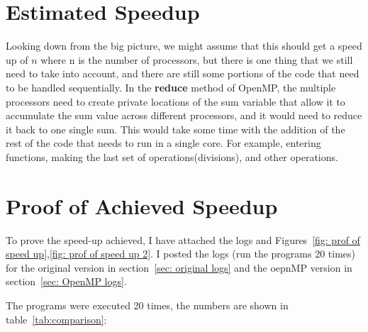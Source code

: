 \documentclass{article}
\begin{document}


\section{Estimated Speedup } \label{sec: expected speed up}
Looking down from the big picture, we might assume that this should get a speed up of $n$ where n is the number of processors, but there is one thing that we still need to take into account, and there are still some portions of the code that need to be handled sequentially.  
In the \textbf{reduce} method of OpenMP, the multiple processors need to create private locations of the sum variable that allow it to accumulate the sum value across different processors, and it would need to reduce it back to one single sum. This would take some time with the addition of the rest of the code that needs to run in a single core. For example, entering functions, making the last set of operations(divisions), and other operations. 


\section{Proof of Achieved Speedup} \label{sec:speedup}
To prove the speed-up achieved, I have attached the logs and Figures~\ref{fig: prof of speed up},\ref{fig: prof of speed up 2}. I posted the logs (run the programs 20 times) for the original version in section~\ref{sec: original logs} and the oepnMP version in section~\ref{sec: OpenMP logs}. 

The programs were executed 20 times, the numbers are shown in table~\ref{tab:comparison}:
\end{document}
